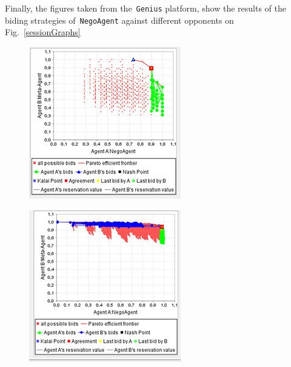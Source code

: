 \documentclass[html]{report}    %
\begin{document}
Finally,  the figures taken from the~\texttt{Genius} platform, show the results of the biding strategies of~\texttt{NegoAgent} against different opponents on Fig.~\ref{sessionGraphs} 
\begin{figure}
\centering
\begin{minipage}{.3\textwidth}
  \centering
  \includegraphics[width=.9\linewidth]{1}
  \label{fig:1}
\end{minipage}%
\begin{minipage}{.3\textwidth}
  \centering
  \includegraphics[width=.9\linewidth]{2}

\end{minipage}
\end{figure}
\end{document}
